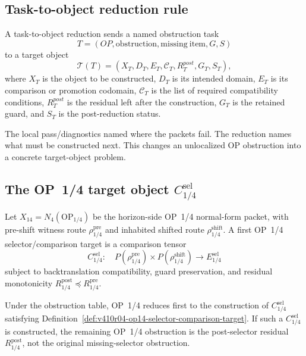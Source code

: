\subsection{Task-to-object reduction rule}
\label{subsec:v410r04-task-to-object-reduction-rule}

\begin{definition}
\label{def:v410r04-task-to-object-reduction}
A task-to-object reduction sends a named obstruction task
\[
 T=(OP,\mathrm{obstruction},\mathrm{missing\ item},G,S)
\]
to a target object
\[
 \mathcal T(T)=(X_T,D_T,E_T,\mathcal C_T,R_T^{post},G_T,S_T),
\]
where $X_T$ is the object to be constructed, $D_T$ is its intended domain,
$E_T$ is its comparison or promotion codomain, $\mathcal C_T$ is the list of
required compatibility conditions, $R_T^{post}$ is the residual left after the
construction, $G_T$ is the retained guard, and $S_T$ is the post-reduction
status.
\end{definition}

\begin{remark}
\label{rem:v410r04-why-this-is-progress}
The local pass/diagnostics named where the packets fail. The reduction names
what must be constructed next. This changes an unlocalized OP obstruction into
a concrete target-object problem.
\end{remark}

\subsection{The OP~1/4 target object $C_{1/4}^{\mathrm{sel}}$}
\label{subsec:v410r04-op14-target-object}

\begin{definition}
\label{def:v410r04-op14-selector-comparison-target}
Let $X_{14}=N_4(\mathrm{OP}_{1/4})$ be the horizon-side OP~1/4 normal-form packet, with
pre-shift witness route $\rho_{1/4}^{\mathrm{pre}}$ and inhabited shifted route $\rho_{1/4}^{\mathrm{shift}}$.
A first OP~1/4 selector/comparison target is a comparison tensor
\[
 C_{1/4}^{\mathrm{sel}}:\quad
 P(\rho_{1/4}^{\mathrm{pre}})\times P(\rho_{1/4}^{\mathrm{shift}})\longrightarrow E_{1/4}^{\mathrm{sel}}
\]
subject to backtranslation compatibility, guard preservation, and residual
monotonicity $R_{1/4}^{\mathrm{post}}\preccurlyeq R_{1/4}^{\mathrm{pre}}$.
\end{definition}

\begin{proposition}
\label{prop:v410r04-op14-task-object-reduction}
Under the obstruction table, OP~1/4 reduces first to the construction of
$C_{1/4}^{\mathrm{sel}}$ satisfying Definition~\ref{def:v410r04-op14-selector-comparison-target}.
If such a $C_{1/4}^{\mathrm{sel}}$ is constructed, the remaining OP~1/4 obstruction is the
post-selector residual $R_{1/4}^{\mathrm{post}}$, not the original missing-selector
obstruction.
\end{proposition}

